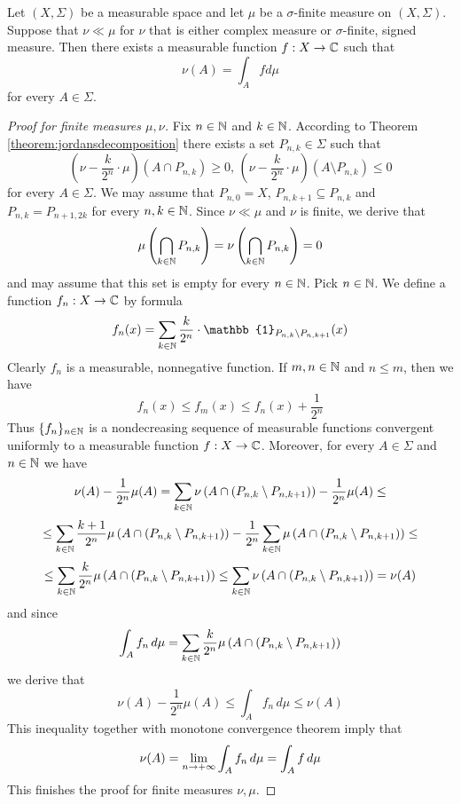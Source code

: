 \begin{theorem}\label{theorem:radonnikodymmain}
Let $(X,\Sigma)$ be a measurable space and let $\mu$ be a $\sigma$-finite measure on $(X,\Sigma)$. Suppose that $\nu \ll \mu$ for $\nu$ that is either complex measure or $\sigma$-finite, signed measure. Then there exists a measurable function $f:X\rightarrow {\mathbb C}$ such that
$$\nu(A) = \int_A f d\mu$$
for every $A\in \Sigma$.
\end{theorem}
\begin{proof}[Proof for finite measures $\mu,\nu$]
Fix $n\in {\mathbb N}$ and $k\in {\mathbb N}$. According to Theorem \ref{theorem:jordansdecomposition} there exists a set $P_{n,k}\in \Sigma$ such that
$$\left(\nu - \frac{k}{2^n}\cdot \mu\right)\left(A\cap P_{n,k}\right)\geq 0,\,\left(\nu - \frac{k}{2^n}\cdot \mu\right)\left(A\setminus P_{n,k}\right)\leq 0$$
for every $A\in \Sigma$. We may assume that $P_{n,0}=X$, $P_{n,k+1}\subseteq P_{n,k}$ and $P_{n,k} =P_{n+1,2k}$ for every $n, k\in {\mathbb N}$. Since $\nu \ll \mu$ and $\nu$ is finite, we derive that
$$\mu\left(\bigcap_{k\in {\mathbb N}}P_{n,k}\right) = \nu\left(\bigcap_{k\in {\mathbb N}}P_{n,k}\right)=0$$
and may assume that this set is empty for every $n\in {\mathbb N}$. Pick $n\in {\mathbb N}$. We define a function $f_n:X\rightarrow {\mathbb C}$ by formula
$$f_n(x) =\sum_{k\in \NN} \frac{k}{2^n}\cdot \mathbb{1}_{P_{n,k}\setminus P_{n,k+1}}(x)$$
Clearly $f_n$ is a measurable, nonnegative function. If $m,n\in {\mathbb N}$ and $n\leq m$, then we have
$$f_n(x)\leq f_m(x)\leq f_n(x)+\frac{1}{2^n}$$
Thus $\{f_n\}_{n\in {\mathbb N}}$ is a nondecreasing sequence of measurable functions convergent uniformly to a measurable function $f:X\rightarrow {\mathbb C}$. Moreover, for every $A\in \Sigma$ and $n\in {\mathbb N}$ we have
$$\nu(A)-\frac{1}{2^n}\mu(A) = \sum_{k\in {\mathbb N}}\nu\left(A\cap \left(P_{n,k}\setminus P_{n,k+1}\right)\right)-\frac{1}{2^n}\mu(A)  \leq$$
$$\leq \sum_{k\in {\mathbb N}}\frac{k+1}{2^n}\mu\left(A\cap \left(P_{n,k}\setminus P_{n,k+1}\right)\right) - \frac{1}{2^n}\sum_{k\in {\mathbb N}}\mu\left(A\cap \left(P_{n,k}\setminus P_{n,k+1}\right)\right) \leq  $$
$$\leq  \sum_{k\in {\mathbb N}}\frac{k}{2^n}\mu\left(A\cap \left(P_{n,k}\setminus P_{n,k+1}\right)\right)\leq \sum_{k\in {\mathbb N}}\nu\left(A\cap \left(P_{n,k}\setminus P_{n,k+1}\right)\right) = \nu(A)$$
and since
$$\int_Af_n\,d\mu =  \sum_{k\in {\mathbb N}}\frac{k}{2^n}\mu\left(A\cap \left(P_{n,k}\setminus P_{n,k+1}\right)\right)$$
we derive that
$$\nu(A)-\frac{1}{2^n}\mu(A) \leq \int_Af_n\,d\mu \leq \nu(A)$$
This inequality together with monotone convergence theorem imply that
$$\nu(A) =  \lim_{n\rightarrow +\infty}\int_Af_n\,d\mu = \int_Af\,d\mu$$
This finishes the proof for finite measures $\nu,\mu$.
\end{proof}

